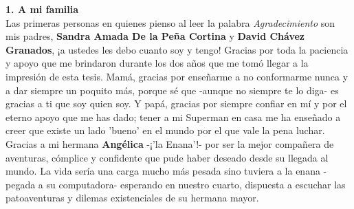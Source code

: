 \documentclass[
12pt, %
spanish, %
onehalfspacing, %
headsepline, %
]{MastersDoctoralThesis} %
\begin{document}

\begin{acknowledgements}
\addchaptertocentry{\acknowledgementname} %

\textbf{1. A mi familia}\\

Las primeras personas en quienes pienso al leer la palabra \textit{Agradecimiento} son mis padres, \textbf{Sandra Amada De la Peña Cortina} y \textbf{David Chávez Granados}, ¡a ustedes les debo cuanto soy y tengo! Gracias por toda la paciencia y apoyo que me brindaron durante los dos años que me tomó llegar a la impresión de esta tesis. Mamá, gracias por enseñarme a no conformarme nunca y a dar siempre un poquito más, porque sé que -aunque no siempre te lo diga- es gracias a ti que soy quien soy. Y papá, gracias por siempre confiar en mí y por el eterno apoyo que me has dado; tener a mi Superman en casa me ha enseñado a creer que existe un lado 'bueno' en el mundo por el que vale la pena luchar. \\

Gracias a mi hermana \textbf{Angélica} -¡'la Enana'!- por ser la mejor compañera de aventuras, cómplice y confidente que pude haber deseado desde su llegada al mundo. La vida sería una carga mucho más pesada sino tuviera a la enana -pegada a su computadora- esperando en nuestro cuarto, dispuesta a escuchar las patoaventuras y dilemas existenciales de su hermana mayor.\\





\end{acknowledgements}
\end{document}
